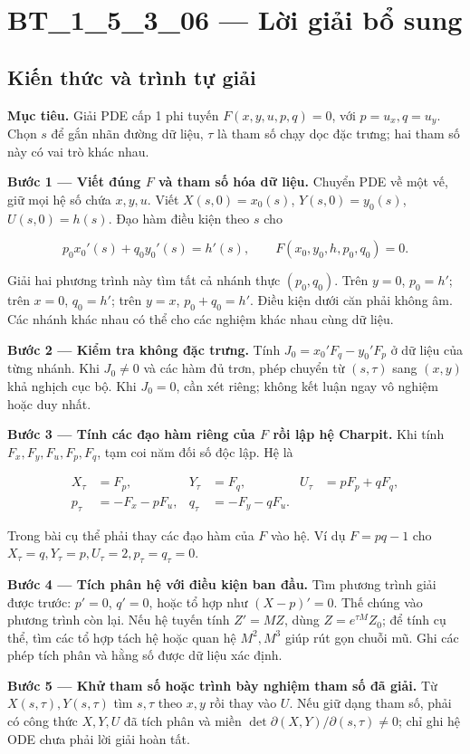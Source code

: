 \documentclass[10pt,a4paper]{article}
\begin{document}
\section*{BT\_1\_5\_3\_06 — Lời giải bổ sung}
\subsection*{Kiến thức và trình tự giải}
\textbf{Mục tiêu.} Giải PDE cấp 1 phi tuyến $F(x,y,u,p,q)=0$, với $p=u_x,q=u_y$. Chọn $s$ để gắn nhãn đường dữ liệu, $\tau$ là tham số chạy dọc đặc trưng; hai tham số này có vai trò khác nhau.

\textbf{Bước 1 — Viết đúng $F$ và tham số hóa dữ liệu.} Chuyển PDE về một vế, giữ mọi hệ số chứa $x,y,u$. Viết $X(s,0)=x_0(s)$, $Y(s,0)=y_0(s)$, $U(s,0)=h(s)$. Đạo hàm điều kiện theo $s$ cho

\[
p_0x_0'(s)+q_0y_0'(s)=h'(s),\qquad
F(x_0,y_0,h,p_0,q_0)=0.
\]

Giải hai phương trình này tìm tất cả nhánh thực $(p_0,q_0)$. Trên $y=0$, $p_0=h'$; trên $x=0$, $q_0=h'$; trên $y=x$, $p_0+q_0=h'$. Điều kiện dưới căn phải không âm. Các nhánh khác nhau có thể cho các nghiệm khác nhau cùng dữ liệu.

\textbf{Bước 2 — Kiểm tra không đặc trưng.} Tính $J_0=x_0'F_q-y_0'F_p$ ở dữ liệu của từng nhánh. Khi $J_0\ne0$ và các hàm đủ trơn, phép chuyển từ $(s,\tau)$ sang $(x,y)$ khả nghịch cục bộ. Khi $J_0=0$, cần xét riêng; không kết luận ngay vô nghiệm hoặc duy nhất.

\textbf{Bước 3 — Tính các đạo hàm riêng của $F$ rồi lập hệ Charpit.} Khi tính $F_x,F_y,F_u,F_p,F_q$, tạm coi năm đối số độc lập. Hệ là

\[
\begin{aligned}
X_\tau&=F_p,&Y_\tau&=F_q,&U_\tau&=pF_p+qF_q,\\
p_\tau&=-F_x-pF_u,&q_\tau&=-F_y-qF_u.
\end{aligned}
\]

Trong bài cụ thể phải thay các đạo hàm của $F$ vào hệ. Ví dụ $F=pq-1$ cho $X_\tau=q,Y_\tau=p,U_\tau=2,p_\tau=q_\tau=0$.

\textbf{Bước 4 — Tích phân hệ với điều kiện ban đầu.} Tìm phương trình giải được trước: $p'=0$, $q'=0$, hoặc tổ hợp như $(X-p)'=0$. Thế chúng vào phương trình còn lại. Nếu hệ tuyến tính $Z'=MZ$, dùng $Z=e^{\tau M}Z_0$; để tính cụ thể, tìm các tổ hợp tách hệ hoặc quan hệ $M^2, M^3$ giúp rút gọn chuỗi mũ. Ghi các phép tích phân và hằng số được dữ liệu xác định.

\textbf{Bước 5 — Khử tham số hoặc trình bày nghiệm tham số đã giải.} Từ $X(s,\tau),Y(s,\tau)$ tìm $s,\tau$ theo $x,y$ rồi thay vào $U$. Nếu giữ dạng tham số, phải có công thức $X,Y,U$ đã tích phân và miền $\det\partial(X,Y)/\partial(s,\tau)\ne0$; chỉ ghi hệ ODE chưa phải lời giải hoàn tất.
\end{document}
